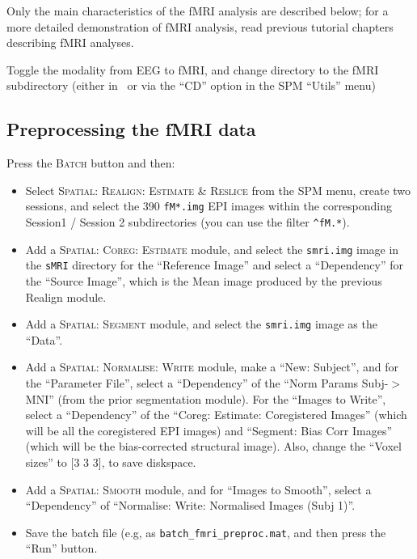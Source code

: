 Only the main characteristics of the fMRI analysis are described below; for a more detailed demonstration of fMRI analysis, read previous tutorial chapters describing fMRI analyses.

Toggle the modality from EEG to fMRI, and change directory to the fMRI subdirectory (either in \matlab\, or via the ``CD'' option in the SPM ``Utils'' menu)

\subsection{Preprocessing the fMRI data}

Press the \textsc{Batch} button and then:

\begin{itemize}
\item Select \textsc{Spatial: Realign: Estimate \& Reslice} from the SPM menu, create two sessions, and select the 390 \texttt{fM*.img} EPI images within the corresponding Session1 / Session 2 subdirectories (you can use the filter  \texttt{^fM.*}).

\item Add a \textsc{Spatial: Coreg: Estimate} module, and select the \texttt{smri.img} image in the \texttt{sMRI} directory for the ``Reference Image'' and select a ``Dependency'' for the ``Source Image'', which is the Mean image produced by the previous Realign module.

\item Add a \textsc{Spatial: Segment} module, and select the \texttt{smri.img} image as the ``Data''.

\item Add a \textsc{Spatial: Normalise: Write} module, make a ``New: Subject'', and for the ``Parameter File'', select a ``Dependency'' of the ``Norm Params Subj-$>$MNI'' (from the prior segmentation module). For the ``Images to Write'', select a ``Dependency'' of the ``Coreg: Estimate: Coregistered Images'' (which will be all the coregistered EPI images) and ``Segment: Bias Corr Images'' (which will be the bias-corrected structural image). Also, change the ``Voxel sizes'' to [3 3 3], to save diskspace.

\item Add a \textsc{Spatial: Smooth} module, and for ``Images to Smooth'', select a ``Dependency'' of ``Normalise: Write: Normalised Images (Subj 1)''.

\item Save the batch file (e.g, as \texttt{batch\_fmri\_preproc.mat}, and then press the ``Run'' button.
\end{itemize}

